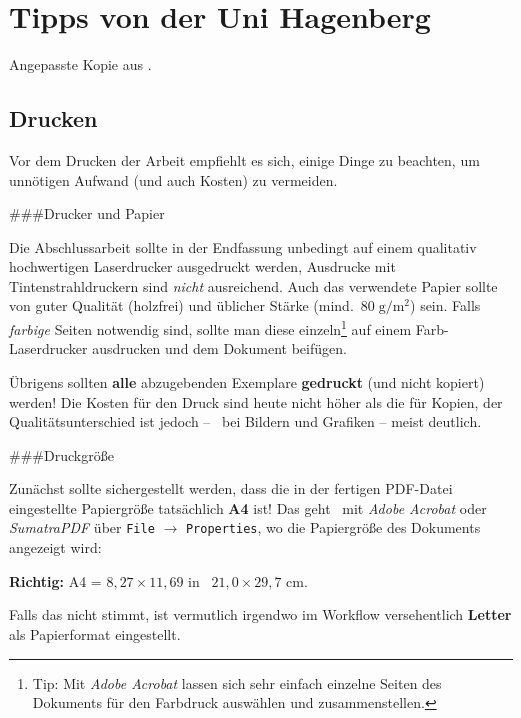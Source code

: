 \hypertarget{tipps-von-der-uni-hagenberg}{%
\section{Tipps von der Uni
Hagenberg}\label{tipps-von-der-uni-hagenberg}}

Angepasste Kopie aus \citep{hagenberg}.

\hypertarget{drucken}{%
\subsection{Drucken}\label{drucken}}

Vor dem Drucken der Arbeit empfiehlt es sich, einige Dinge zu beachten,
um unnötigen Aufwand (und auch Kosten) zu vermeiden.

\#\#\#Drucker und Papier

Die Abschlussarbeit sollte in der Endfassung unbedingt auf einem
qualitativ hochwertigen Laserdrucker ausgedruckt werden, Ausdrucke mit
Tintenstrahldruckern sind \emph{nicht} ausreichend. Auch das verwendete
Papier sollte von guter Qualität (holzfrei) und üblicher Stärke
(mind.~\(80\; {\mathrm g} / {\mathrm m}^2\)) sein. Falls \emph{farbige}
Seiten notwendig sind, sollte man diese einzeln\footnote{Tip: Mit
  \emph{Adobe Acrobat} lassen sich sehr einfach einzelne Seiten des
  Dokuments für den Farbdruck auswählen und zusammenstellen.} auf einem
Farb-Laserdrucker ausdrucken und dem Dokument beifügen.

Übrigens sollten \textbf{alle} abzugebenden Exemplare \textbf{gedruckt}
(und nicht kopiert) werden! Die Kosten für den Druck sind heute nicht
höher als die für Kopien, der Qualitätsunterschied ist jedoch -- \va~bei
Bildern und Grafiken -- meist deutlich.

\#\#\#Druckgröße

Zunächst sollte sichergestellt werden, dass die in der fertigen
PDF-Datei eingestellte Papiergröße tatsächlich \textbf{A4} ist! Das geht
\zB~mit \emph{Adobe Acrobat} oder \emph{SumatraPDF} über \texttt{File}
\(\rightarrow\) \texttt{Properties}, wo die Papiergröße des Dokuments
angezeigt wird:

\begin{center}
\textbf{Richtig:} A4 = $8{,}27 \times 11{,}69$ in \bzw\ $21{,}0 \times 29{,}7$ cm.
\end{center}

Falls das nicht stimmt, ist vermutlich irgendwo im Workflow
versehentlich \textbf{Letter} als Papierformat eingestellt.

